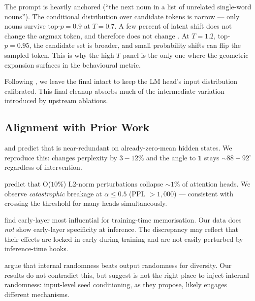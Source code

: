 The \dat prompt is heavily anchored (``the next noun in a list of
unrelated single-word nouns''). The conditional distribution over candidate
tokens is narrow --- only nouns survive top-$p{=}0.9$ at $T{=}0.7$. A few
percent of latent shift does not change the argmax token, and therefore
does not change \dat. At $T{=}1.2$, top-$p{=}0.95$, the candidate set is
broader, and small probability shifts can flip the sampled token. This is
why the high-$T$ panel is the only one where the geometric expansion
surfaces in the behavioural metric.

Following \citet{kanavalau2026taper}, we leave the final \layernorm intact
to keep the LM head's input distribution calibrated. This final cleanup
absorbs much of the intermediate variation introduced by upstream
ablations.

\subsection{Alignment with Prior Work}

\citet{brody2023expressivity} and \citet{gupta2024geometric} predict that
\nomean is near-redundant on already-zero-mean hidden states. We
reproduce this: \nomean changes perplexity by $3\!-\!12\%$ and the angle
to $\bm{1}$ stays $\sim\!88\!-\!92^\circ$ regardless of intervention.

\citet{menary2024transformer} predict that O($10\%$) L2-norm perturbations
collapse $\sim\!1\%$ of attention heads. We observe \emph{catastrophic}
breakage at $\alpha\le 0.5$ \weakened (PPL $> 1{,}000$) --- consistent with
crossing the threshold for many heads simultaneously.

\citet{singhal2025impact} find early-layer \layernorm most influential for
training-time memorisation. Our \dat data does \emph{not} show
early-layer specificity at inference. The discrepancy may reflect that
their effects are locked in early during training and are not easily
perturbed by inference-time hooks.

\citet{nagarajan2025roll} argue that internal randomness beats output
randomness for diversity. Our results do not contradict this, but suggest
\layernorm is not the right place to inject internal randomness:
input-level seed conditioning, as they propose, likely engages different
mechanisms.

